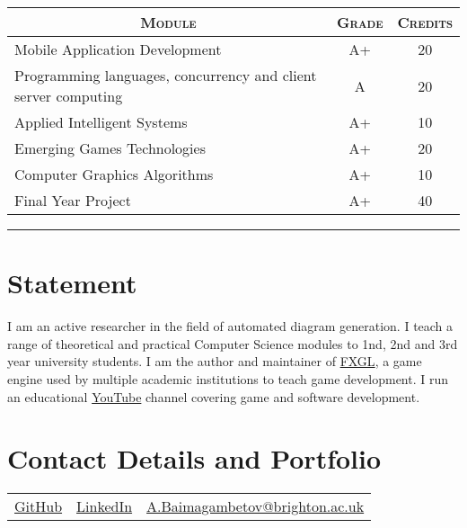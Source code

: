 \documentclass[a4paper,10pt]{article} %
\begin{document}
\begin{center}
\begin{tabular}{lcc}
\multicolumn{1}{c}{\textsc{Module}} & \textsc{Grade}&\textsc{Credits}\\ \hline
Mobile Application Development                                  & A+ & 20\\
Programming languages, concurrency and client server computing  & A & 20\\
Applied Intelligent Systems                                     & A+ & 10\\
Emerging Games Technologies                                     & A+ & 20\\
Computer Graphics Algorithms                                    & A+ & 10\\
Final Year Project                                              & A+ & 40\\
\end{tabular}
\end{center}
\bigskip
\hrule
\vspace{1cm}

\section{Statement}

I am an active researcher in the field of automated diagram generation.
I teach a range of theoretical and practical Computer Science modules to 1nd, 2nd and 3rd year
university students.
I am the author and maintainer of \href{https://github.com/AlmasB/FXGL}{FXGL}, a game engine used by multiple
academic institutions to teach game development.
I run an educational \href{https://www.youtube.com/almasb0/videos}{YouTube} channel covering
game and software development.


\section{Contact Details and Portfolio}

\begin{tabular}{c | c | c}
\href{https://github.com/AlmasB}{GitHub}
& \href{https://www.linkedin.com/in/AlmasB}{LinkedIn}
& \href{mailto:A.Baimagambetov@brighton.ac.uk}{A.Baimagambetov@brighton.ac.uk} 


\end{tabular}
\end{document}
